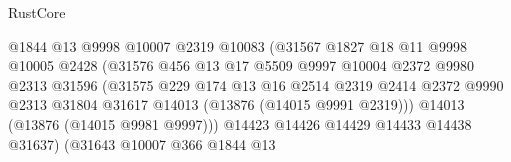 \begin{lexlean}{RustCore}
\begin{coremodule}
                                        @1844
                                        @13
                                        @9998
                                        @10007
                                        @2319
                                        @10083
                                        (@31567
                                          @1827
                                          @18
                                          @11
                                          @9998
                                          @10005
                                          @2428
                                          (@31576
                                            @456
                                            @13
                                            @17
                                            @5509
                                            @9997
                                            @10004
                                            @2372
                                            @9980
                                            @2313
                                            @31596
                                            (@31575
                                              @229
                                              @174
                                              @13
                                              @16
                                              @2514
                                              @2319
                                              @2414
                                              @2372
                                              @9990
                                              @2313
                                              @31804
                                              @31617
                                              @14013
                                              (@13876 (@14015 @9991 @2319)))
                                            @14013
                                            (@13876 (@14015 @9981 @9997)))
                                          @14423
                                          @14426
                                          @14429
                                          @14433
                                          @14438
                                          @31637)
                                        (@31643
                                          @10007
                                          @366
                                          @1844
                                          @13

\end{coremodule}
\end{lexlean}
